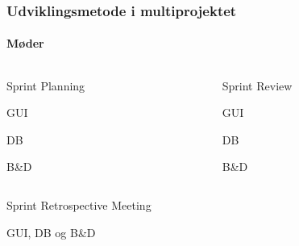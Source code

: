 \begin{frame}
    \frametitle{Udviklingsmetode i multiprojektet}
    \framesubtitle{Møder}
    
    \begin{columns}
    \begin{column}{0.45\textwidth}
      \begin{mtjbox}[backgroundcolor=color1!5, linecolor=color1!40]
        Sprint Planning
            \begin{mtjbox}
              GUI
            \end{mtjbox}\unskip
            \begin{mtjbox}
              DB
            \end{mtjbox}\unskip
            \begin{mtjbox}
              B\&D
            \end{mtjbox}\unskip
      \end{mtjbox}
    \end{column}
    \pause
    \begin{column}{0.45\textwidth}
      \begin{mtjbox}[backgroundcolor=color1!5, linecolor=color1!40]
        Sprint Review
            \begin{mtjbox}
              GUI
            \end{mtjbox}\unskip
            \begin{mtjbox}
              DB
            \end{mtjbox}\unskip
            \begin{mtjbox}
              B\&D
            \end{mtjbox}\unskip
      \end{mtjbox}
    \end{column}
    \end{columns}
    \pause
    \begin{mtjbox}[backgroundcolor=color1!5, linecolor=color1!40]
      Sprint Retrospective Meeting
      \begin{mtjbox}
              GUI, DB og B\&D
            \end{mtjbox}
    \end{mtjbox}
\end{frame}


